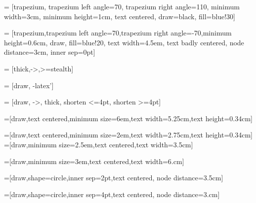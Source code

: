  = [trapezium, trapezium left angle=70, trapezium right angle=110, minimum width=3cm, minimum height=1cm, text centered, draw=black, fill=blue!30]

 = [trapezium,trapezium left angle=70,trapezium right angle=-70,minimum height=0.6cm, draw, fill=blue!20, text width=4.5em, text badly centered, node distance=3cm, inner sep=0pt]

 = [thick,->,>=stealth]

 = [draw, -latex']

 = [draw, ->,  thick, shorten <=4pt, shorten >=4pt]

=[draw,text centered,minimum size=6em,text width=5.25cm,text height=0.34cm]

=[draw,text centered,minimum size=2em,text width=2.75cm,text height=0.34cm]
=[draw,minimum size=2.5em,text centered,text width=3.5cm]

=[draw,minimum size=3em,text centered,text width=6.cm]

=[draw,shape=circle,inner sep=2pt,text centered, node distance=3.5cm]

=[draw,shape=circle,inner sep=4pt,text centered, node distance=3.cm]
\newtheorem{theorem}{Theorem}
\newtheorem{lemma}{Lemma}
\newtheorem{definition}{Defini\c{c}\~{a}o}
\newtheorem{notation}{Notation}
